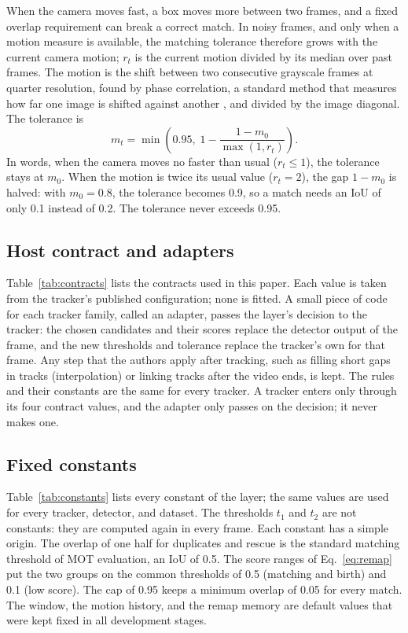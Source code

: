 When the camera moves fast, a box moves more between two frames, and a fixed
overlap requirement can break a correct match. In noisy frames, and only when
a motion measure is available, the matching tolerance therefore grows with
the current camera motion; $r_t$ is the current motion divided by its median
over past frames. The motion is the shift between two consecutive grayscale
frames at quarter resolution, found by phase correlation, a standard method
that measures how far one image is shifted against another
\cite{reddy1996phasecorr}, and divided by the image diagonal. The tolerance is
\begin{equation}
m_t=\min\!\left(0.95,\;1-\frac{1-m_0}{\max(1,r_t)}\right).
\label{eq:motion}
\end{equation}
In words, when the camera moves no faster than usual ($r_t\le1$), the
tolerance stays at $m_0$. When the motion is twice its usual value
($r_t=2$), the gap $1-m_0$ is halved: with $m_0=0.8$, the tolerance becomes
0.9, so a match needs an IoU of only 0.1 instead of 0.2. The tolerance never
exceeds 0.95.

\subsection{Host contract and adapters}\label{sec:contract}
Table~\ref{tab:contracts} lists the contracts used in this paper. Each value
is taken from the tracker's published configuration; none is fitted. A small
piece of code for each tracker family, called an adapter, passes the layer's
decision to the tracker:
the chosen candidates and their scores replace the detector output of the
frame, and the new thresholds and tolerance replace the tracker's own for
that frame. Any step that the authors apply after tracking, such as
filling short gaps in tracks (interpolation) or linking tracks after the video
ends, is kept. The rules and their constants are
the same for every tracker. A tracker enters only through its four contract
values, and the adapter only passes on the decision; it never makes one.



\subsection{Fixed constants}\label{sec:constants}
Table~\ref{tab:constants} lists every constant of the layer; the same values
are used for every tracker, detector, and dataset. The thresholds $t_1$ and
$t_2$ are not constants: they are computed again in every frame. Each
constant has a simple origin. The overlap of one half for duplicates and
rescue is the standard matching threshold of MOT evaluation, an IoU of 0.5. The score ranges of Eq.~\eqref{eq:remap} put the two
groups on the common thresholds of 0.5 (matching and birth) and 0.1 (low
score). The cap of 0.95 keeps a minimum overlap of 0.05 for every match. The
window, the motion history, and the remap memory are default values that were
kept fixed in all development stages.

